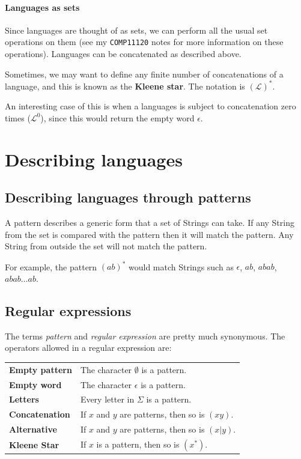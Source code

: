 \paragraph{Languages as sets} Since languages are thought of as sets, we can
perform all the usual set operations on them (see my {\tt COMP11120} notes for
more information on these operations). Languages can be concatenated as
described above.

Sometimes, we may want to define any finite number of concatenations of a
language, and this is known as the {\bf Kleene star}. The notation is
$(\mathcal{L})^*$.

An interesting case of this is when a languages is subject to concatenation zero
times ($\mathcal{L}^0$), since this would return the empty word $\epsilon$.


\section{Describing languages}

\subsection{Describing languages through patterns}

A pattern describes a generic form that a set of Strings can take. If any String
from the set is compared with the pattern then it will match the pattern. Any
String from outside the set will not match the pattern.

For example, the pattern $(ab)^*$ would match Strings such as $\epsilon$, $ab$,
$abab$, $abab \dots ab$.


\subsection{Regular expressions}

The terms {\it pattern} and {\it regular expression} are pretty much synonymous.
The operators allowed in a regular expression are:

\begin{center}
  \begin{tabular}{>{\bfseries} l l}
    Empty pattern & The character $\emptyset$ is a pattern.\\
    Empty word & The character $\epsilon$ is a pattern.\\
    Letters & Every letter in $\Sigma$ is a pattern.\\
    \rowcolor{Gray}
    Concatenation & If $x$ and $y$ are patterns, then so is $(xy)$.\\
    \rowcolor{Gray}
    Alternative & If $x$ and $y$ are patterns, then so is $(x|y)$.\\
    \rowcolor{Gray}
    Kleene Star & If $x$ is a pattern, then so is $(x^*)$.
  \end{tabular}
\end{center}

